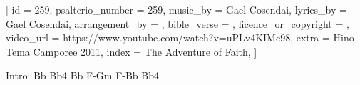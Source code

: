[
    id                     = {259},
    psalterio_number       = {259},
    music_by               = {Gael Cosendai},
    lyrics_by              = {Gael Cosendai},
    arrangement_by         = {},
    bible_verse            = {},
    licence_or_copyright   = {},
    video_url              = {https://www.youtube.com/watch?v=uPLv4KIMc98},
    extra                  = {Hino Tema Camporee 2011},
    index                  = {The Adventure of Faith},
]


\beginverse
Intro: Bb Bb4 Bb F-Gm F-Bb Bb4
\endnverse


